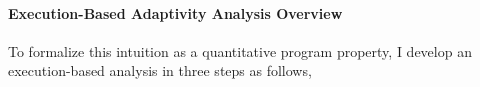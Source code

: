 \paragraph*{Execution-Based Adaptivity Analysis Overview}
To formalize this intuition as a quantitative program property, I develop an execution-based analysis
 in three steps as follows,
